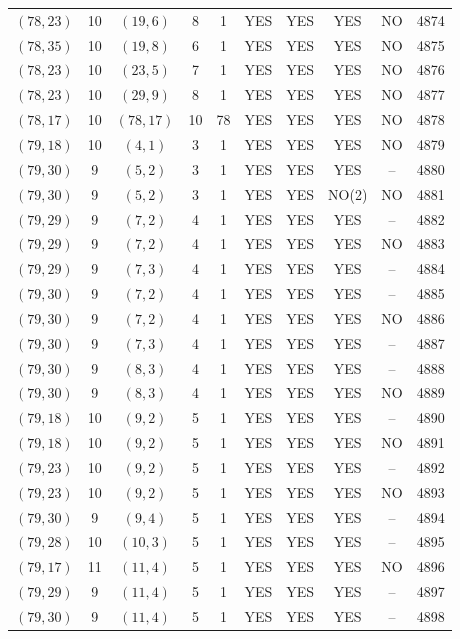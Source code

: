 \begin{longtable}{|c|c|c|c|c|c|c|c|c|c|}
$(78, 23)$ & 10 & $(19, 6)$ & 8 & 1 & YES & YES & YES & NO & 4874\\
$(78, 35)$ & 10 & $(19, 8)$ & 6 & 1 & YES & YES & YES & NO & 4875\\
$(78, 23)$ & 10 & $(23, 5)$ & 7 & 1 & YES & YES & YES & NO & 4876\\
$(78, 23)$ & 10 & $(29, 9)$ & 8 & 1 & YES & YES & YES & NO & 4877\\
$(78, 17)$ & 10 & $(78, 17)$ & 10 & 78 & YES & YES & YES & NO & 4878\\
$(79, 18)$ & 10 & $(4, 1)$ & 3 & 1 & YES & YES & YES & NO & 4879\\
$(79, 30)$ & 9 & $(5, 2)$ & 3 & 1 & YES & YES & YES & -- & 4880\\
$(79, 30)$ & 9 & $(5, 2)$ & 3 & 1 & YES & YES & NO(2) & NO & 4881\\
$(79, 29)$ & 9 & $(7, 2)$ & 4 & 1 & YES & YES & YES & -- & 4882\\
$(79, 29)$ & 9 & $(7, 2)$ & 4 & 1 & YES & YES & YES & NO & 4883\\
$(79, 29)$ & 9 & $(7, 3)$ & 4 & 1 & YES & YES & YES & -- & 4884\\
$(79, 30)$ & 9 & $(7, 2)$ & 4 & 1 & YES & YES & YES & -- & 4885\\
$(79, 30)$ & 9 & $(7, 2)$ & 4 & 1 & YES & YES & YES & NO & 4886\\
$(79, 30)$ & 9 & $(7, 3)$ & 4 & 1 & YES & YES & YES & -- & 4887\\
$(79, 30)$ & 9 & $(8, 3)$ & 4 & 1 & YES & YES & YES & -- & 4888\\
$(79, 30)$ & 9 & $(8, 3)$ & 4 & 1 & YES & YES & YES & NO & 4889\\
$(79, 18)$ & 10 & $(9, 2)$ & 5 & 1 & YES & YES & YES & -- & 4890\\
$(79, 18)$ & 10 & $(9, 2)$ & 5 & 1 & YES & YES & YES & NO & 4891\\
$(79, 23)$ & 10 & $(9, 2)$ & 5 & 1 & YES & YES & YES & -- & 4892\\
$(79, 23)$ & 10 & $(9, 2)$ & 5 & 1 & YES & YES & YES & NO & 4893\\
$(79, 30)$ & 9 & $(9, 4)$ & 5 & 1 & YES & YES & YES & -- & 4894\\
$(79, 28)$ & 10 & $(10, 3)$ & 5 & 1 & YES & YES & YES & -- & 4895\\
$(79, 17)$ & 11 & $(11, 4)$ & 5 & 1 & YES & YES & YES & NO & 4896\\
$(79, 29)$ & 9 & $(11, 4)$ & 5 & 1 & YES & YES & YES & -- & 4897\\
$(79, 30)$ & 9 & $(11, 4)$ & 5 & 1 & YES & YES & YES & -- & 4898\\

\end{longtable}
